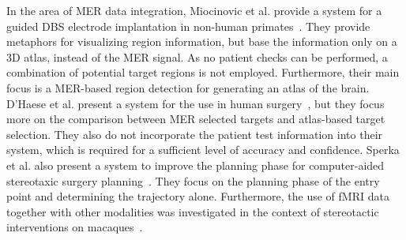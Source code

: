 \documentclass[journal]{vgtc}                %
\begin{document}
In the area of MER data integration, Miocinovic et al. provide a system for a guided DBS electrode implantation in non-human primates~\cite{Miocinovic2007}. They provide metaphors for visualizing region information, but base the information only on a 3D atlas, instead of the MER signal. As no patient checks can be performed, a combination of potential target regions is not employed. Furthermore, their main focus is a MER-based region detection for generating an atlas of the brain. D'Haese et al. present a system for the use in human surgery~\cite{Haese2005}, but they focus more on the comparison between MER selected targets and atlas-based target selection. They also do not incorporate the patient test information into their system, which is required for a sufficient level of accuracy and confidence. Sperka et al. also present a system to improve the planning phase for computer-aided stereotaxic surgery planning~\cite{Sperka2011}. They focus on the planning phase of the entry point and determining the trajectory alone. Furthermore, the use of fMRI data together with other modalities was investigated in the context of stereotactic interventions on macaques~\cite{Ohayon2012}.
\end{document}
